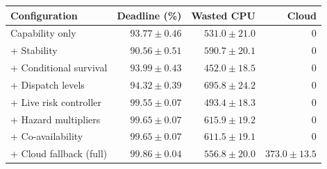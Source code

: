 \begin{tabular}{@{}lrrr@{}}
\toprule
Configuration & Deadline (\%) & Wasted CPU & Cloud \\
\midrule
Capability only & $93.77 \pm 0.46$ & $531.0 \pm 21.0$ & 0 \\
+ Stability & $90.56 \pm 0.51$ & $590.7 \pm 20.1$ & 0 \\
+ Conditional survival & $93.99 \pm 0.43$ & $452.0 \pm 18.5$ & 0 \\
+ Dispatch levels & $94.32 \pm 0.39$ & $695.8 \pm 24.2$ & 0 \\
+ Live risk controller & $99.55 \pm 0.07$ & $493.4 \pm 18.3$ & 0 \\
+ Hazard multipliers & $99.65 \pm 0.07$ & $615.9 \pm 19.2$ & 0 \\
+ Co-availability & $99.65 \pm 0.07$ & $611.5 \pm 19.1$ & 0 \\
+ Cloud fallback (full) & $99.86 \pm 0.04$ & $556.8 \pm 20.0$ & $373.0 \pm 13.5$ \\
\bottomrule
\end{tabular}
